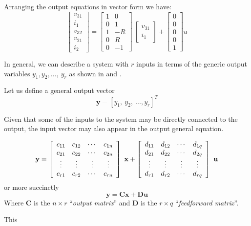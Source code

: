 \begin{slide}
Arranging the output equations in vector form we have:
\begin{displaymath}
\left[\begin{array}{c}
  v_{31} \\
  i_1 \\
  v_{32} \\
  v_{21} \\
  i_2
\end{array}\right] = \left[\begin{array}{cc}
  1 & 0 \\
  0 & 1 \\
  1 & -R \\
  0 & R \\
  0 & -1
\end{array}\right]\ \left[\begin{array}{c}
  v_{31} \\
  i_1
\end{array}\right]+\left[\begin{array}{c}
  0 \\
  0 \\
  0 \\
  0 \\
  1
\end{array}\right] u
\end{displaymath}
\end{slide}
\fi
In general, we can describe a system with $r$ inputs in terms of
the generic output variables $y_1, y_2,\ldots,\ y_r$ as shown in
 and .
\begin{slide}\label{slides:l13s5}
 Let us define a general
output vector
\[\mathbf{y} = \left[y_1,\ y_2,\ \ldots, y_r\right]^T\]

Given that some of the inputs to the system may be directly
connected to the output, the input vector may also appear in the
output general equation.
\end{slide}
\begin{slide}\label{slides:l13s6}
\[
\mathbf{y}=\left[\begin{array}{cccc}
  c_{11} & c_{12} & \cdots & c_{1n} \\
  c_{21} & c_{22} & \cdots & c_{2n} \\
  \vdots & \vdots & \vdots & \vdots \\
  c_{r1} & c_{r2} & \cdots & c_{rn}
\end{array}\right]\ \mathbf{x} + \left[\begin{array}{cccc}
  d_{11} & d_{12} & \cdots & d_{1q} \\
  d_{21} & d_{22} & \cdots & d_{2q} \\
  \vdots & \vdots & \vdots & \vdots \\
  d_{r1} & d_{r2} & \cdots & d_{rq}
\end{array}\right]\ \mathbf{u} \\
\]
or more succinctly
\[
\mathbf{y}=\mathbf{C}\mathbf{x}+\mathbf{D}\mathbf{u}
\]
Where $\mathbf{C}$ is the $n\times r$ ``\emph{output matrix}'' and
$\mathbf{D}$ is the $r\times q$ ``\emph{feedforward matrix}''.
\end{slide} This
